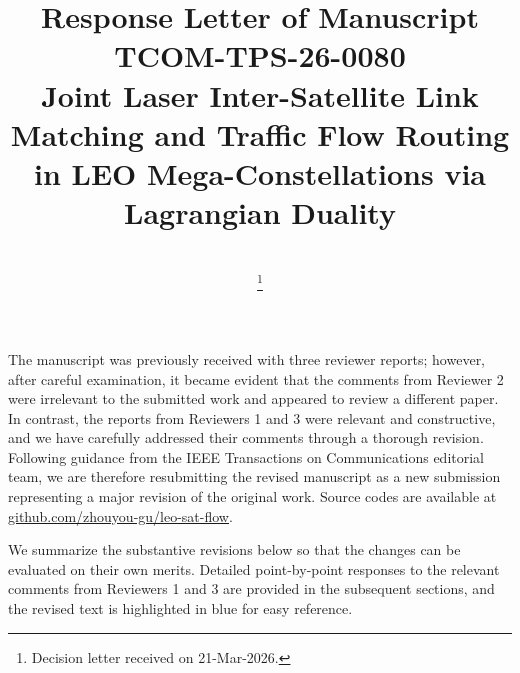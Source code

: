 \documentclass[journal,12pt,onecolumn,draftclsnofoot,]{IEEEtran}
\title{\Large \textbf{Response Letter of Manuscript TCOM-TPS-26-0080}\\
{\Large Joint Laser Inter-Satellite Link Matching and Traffic Flow Routing in LEO Mega-Constellations via Lagrangian Duality}}
\author{
\IEEEauthorblockN{Zhouyou Gu, Jinho Choi, Jihong Park}\\
\thanks{Decision letter received on 21-Mar-2026.}}
\begin{document}
\maketitle

The manuscript was previously received with three reviewer reports; however, after careful examination, it became evident that the comments from Reviewer 2 were irrelevant to the submitted work and appeared to review a different paper. In contrast, the reports from Reviewers 1 and 3 were relevant and constructive, and we have carefully addressed their comments through a thorough revision. Following guidance from the IEEE Transactions on Communications editorial team, we are therefore resubmitting the revised manuscript as a new submission representing a major revision of the original work. Source codes are available at \url{github.com/zhouyou-gu/leo-sat-flow}.

We summarize the substantive revisions below so that the changes can be evaluated on their own merits. Detailed point-by-point responses to the relevant comments from Reviewers 1 and 3 are provided in the subsequent sections, and the revised text is highlighted in blue for easy reference.
\end{document}

